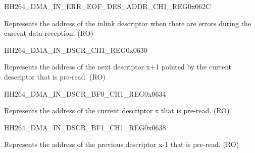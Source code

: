     
    \begin{register}{H}{H264\_DMA\_IN\_ERR\_EOF\_DES\_ADDR\_CH1\_REG}{0x062C}\label{regdesc:H264DMAINERREOFDESADDRCH1REG}
    \regnewline%
    \begin{regdesc}\begin{reglist}
    \label{fielddesc:H264DMAINERREOFDESADDRCH1}\item [H264\_DMA\_IN\_ERR\_EOF\_DES\_ADDR\_CH1] Represents the address of the inlink descriptor when there are errors during the current data reception. (RO)
    \end{reglist}\end{regdesc}
    \end{register}
    
    
    \begin{register}{H}{H264\_DMA\_IN\_DSCR\_CH1\_REG}{0x0630}\label{regdesc:H264DMAINDSCRCH1REG}
    \regnewline%
    \begin{regdesc}\begin{reglist}
    \label{fielddesc:H264DMAINLINKDSCRCH1}\item [H264\_DMA\_INLINK\_DSCR\_CH1] Represents the address of the next descriptor x+1 pointed by the current descriptor that is pre-read. (RO)
    \end{reglist}\end{regdesc}
    \end{register}
    
    
    \begin{register}{H}{H264\_DMA\_IN\_DSCR\_BF0\_CH1\_REG}{0x0634}\label{regdesc:H264DMAINDSCRBF0CH1REG}
    \regnewline%
    \begin{regdesc}\begin{reglist}
    \label{fielddesc:H264DMAINLINKDSCRBF0CH1}\item [H264\_DMA\_INLINK\_DSCR\_BF0\_CH1] Represents the address of the current descriptor x that is pre-read. (RO)
    \end{reglist}\end{regdesc}
    \end{register}
    
    
    \begin{register}{H}{H264\_DMA\_IN\_DSCR\_BF1\_CH1\_REG}{0x0638}\label{regdesc:H264DMAINDSCRBF1CH1REG}
    \regnewline%
    \begin{regdesc}\begin{reglist}
    \label{fielddesc:H264DMAINLINKDSCRBF1CH1}\item [H264\_DMA\_INLINK\_DSCR\_BF1\_CH1] Represents the address of the previous descriptor x-1 that is pre-read. (RO)
    \end{reglist}\end{regdesc}
    \end{register}
    
